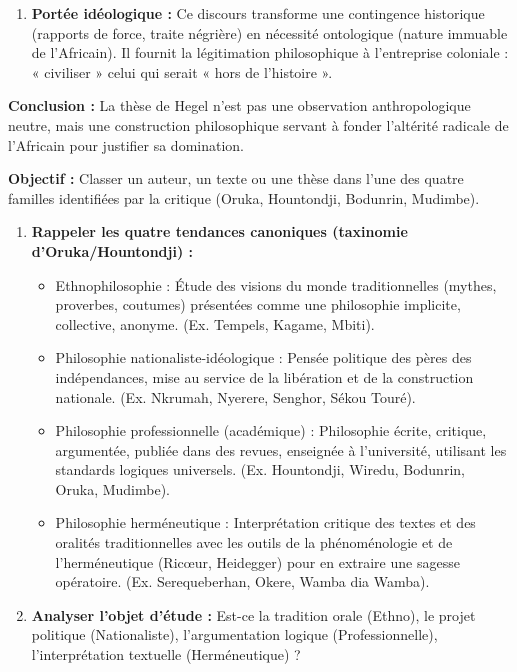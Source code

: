\documentclass[11pt]{article}
\newcommand{\cle}[1]{{\popxbold\color{popdark}#1}}
\begin{document}
\begin{exoresolu}
\begin{enumerate}
    \item \textbf{Portée idéologique :} Ce discours transforme une \cle{contingence historique} (rapports de force, traite négrière) en \cle{nécessité ontologique} (nature immuable de l'Africain). Il fournit la \cle{légitimation philosophique} à l'entreprise coloniale : « civiliser » celui qui serait « hors de l'histoire ».
\end{enumerate}
\textbf{Conclusion :} La thèse de Hegel n'est pas une observation anthropologique neutre, mais une \cle{construction philosophique} servant à fonder l'altérité radicale de l'Africain pour justifier sa domination.
\end{exoresolu}

\begin{methode}
\textbf{Objectif :} Classer un auteur, un texte ou une thèse dans l'une des quatre familles identifiées par la critique (Oruka, Hountondji, Bodunrin, Mudimbe).
\begin{enumerate}
    \item \textbf{Rappeler les quatre tendances canoniques (taxinomie d'Oruka/Hountondji) :}
        \begin{itemize}
            \item \cle{Ethnophilosophie} : Étude des visions du monde traditionnelles (mythes, proverbes, coutumes) présentées comme une philosophie implicite, collective, anonyme. (Ex. Tempels, Kagame, Mbiti).
            \item \cle{Philosophie nationaliste-idéologique} : Pensée politique des pères des indépendances, mise au service de la libération et de la construction nationale. (Ex. Nkrumah, Nyerere, Senghor, Sékou Touré).
            \item \cle{Philosophie professionnelle (académique)} : Philosophie écrite, critique, argumentée, publiée dans des revues, enseignée à l'université, utilisant les standards logiques universels. (Ex. Hountondji, Wiredu, Bodunrin, Oruka, Mudimbe).
            \item \cle{Philosophie herméneutique} : Interprétation critique des textes et des oralités traditionnelles avec les outils de la phénoménologie et de l'herméneutique (Ricœur, Heidegger) pour en extraire une sagesse opératoire. (Ex. Serequeberhan, Okere, Wamba dia Wamba).
        \end{itemize}
    \item \textbf{Analyser l'objet d'étude :} Est-ce la \cle{tradition orale} (Ethno), le \cle{projet politique} (Nationaliste), l'\cle{argumentation logique} (Professionnelle), l'\cle{interprétation textuelle} (Herméneutique) ?

\end{enumerate}
\end{methode}
\end{document}

